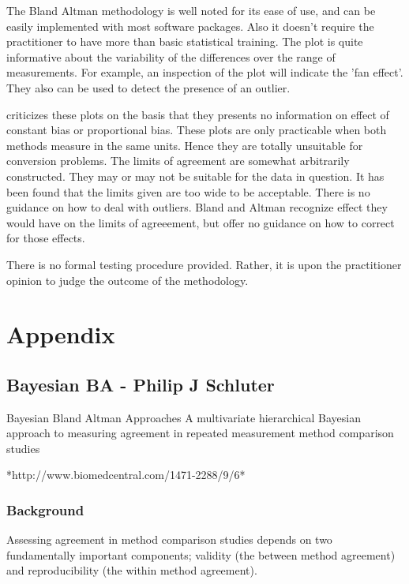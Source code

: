 \documentclass[12pt, a4paper]{report}
\begin{document}
The Bland Altman methodology is well noted for its ease of use,
and can be easily implemented with most software packages. Also it
doesn't require the practitioner to have more than basic
statistical training. The plot is quite informative about the
variability of the differences over the range of measurements. For
example, an inspection of the plot will indicate the 'fan effect'.
They also can be used to detect the presence of an outlier.

 \citet{ludbrook97,ludbrook02}criticizes these plots on the
basis that they presents no information on effect of constant bias
or proportional bias. These plots are only practicable when both
methods measure in the same units. Hence they are totally
unsuitable for conversion problems. The limits of agreement are
somewhat arbitrarily constructed. They may or may not be suitable
for the data in question. It has been found that the limits given
are too wide to be acceptable. There is no guidance on how to deal
with outliers. Bland and Altman recognize effect they would have
on the limits of agreeement, but offer no guidance on how to
correct for those effects.

There is no formal testing procedure provided. Rather, it is upon
the practitioner opinion to judge the outcome of the methodology.







\chapter{Appendix}


\section*{Bayesian BA - Philip J Schluter}
Bayesian Bland Altman Approaches
A multivariate hierarchical Bayesian approach to measuring agreement in repeated
measurement method comparison studies

*http://www.biomedcentral.com/1471-2288/9/6*



\subsection*{Background}
Assessing agreement in method comparison studies depends on two fundamentally important components; validity (the between method agreement) and reproducibility (the within method agreement). 
\end{document}
